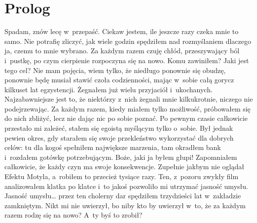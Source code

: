 \chapter{Prolog}

\begin{itquote}
Spadam, znów lecę w~przepaść. Ciekaw jestem, ile jeszcze razy czeka mnie to samo. Nie potrafię zliczyć, jak wiele godzin spędziłem nad rozmyślaniem dlaczego ja, czemu to mnie wybrano. Za każdym razem czuję chłód, przeszywający ból i~pustkę, po czym cierpienie rozpoczyna się na nowo. Komu zawiniłem? Jaki jest tego cel? Nie mam pojęcia, wiem tylko, że niedługo ponownie się obudzę, ponownie będę musiał stawić czoła codzienności, mając w~sobie całą gorycz kilkuset lat egzystencji. Żegnałem już wielu przyjaciół i~ukochanych. Najzabawniejsze jest to, że niektórzy z~nich żegnali mnie kilkukrotnie, niczego nie podejrzewając. Za każdym razem, kiedy miałem tylko możliwość, próbowałem się do nich zbliżyć, lecz nie dając nic po sobie poznać. Po pewnym czasie całkowicie przestało mi zależeć, stałem się egoistą myślącym tylko o~sobie. Był jednak pewien okres, gdy starałem się swoje przekleństwo wykorzystać dla dobrych celów: tu dla kogoś spełniłem największe marzenia, tam okradłem bank i~rozdałem gotówkę potrzebującym. Boże, jaki ja byłem głupi! Zapomniałem całkowicie, że każdy czyn ma swoje konsekwencje. Zupełnie jakbym nie oglądał Efektu Motyla, a~robiłem to przecież tysiące razy. Ten, z~pozoru zwykły film analizowałem klatka po klatce i~to jakoś pozwoliło mi utrzymać jasność umysłu. Jasność umysłu… przez ten cholerny dar spędziłem trzydzieści lat w~zakładzie zamkniętym. Nikt mi nie uwierzył, bo niby kto by uwierzył w~to, że za każdym razem rodzę się na nowo? A~ty byś to zrobił?
\end{itquote}
